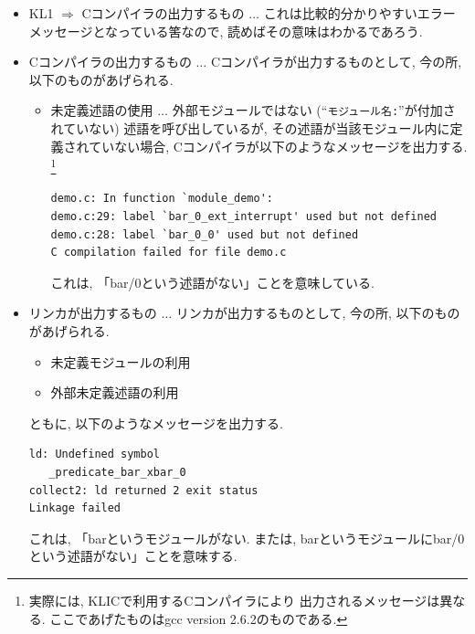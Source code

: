 \documentclass[a4,titlepage]{jsreport}
\begin{document}
\begin{itemize}
\item KL1 $\Rightarrow$ Cコンパイラの出力するもの
$\ldots$ これは比較的分かりやすいエラーメッセージとなっている筈なので, 
読めばその意味はわかるであろう.  

\item Cコンパイラの出力するもの $\ldots$
Cコンパイラが出力するものとして, 今の所, 以下のものがあげられる.  

\begin{itemize}
\item 未定義述語の使用 $\ldots$ 外部モジュールではない 
(``\verb|モジュール名:|''が付加されていない) 述語を呼び出しているが, 
その述語が当該モジュール内に定義されていない場合, 
Cコンパイラが以下のようなメッセージを出力する.  
\footnote{実際には, KLICで利用するCコンパイラにより
出力されるメッセージは異なる.  
ここであげたものはgcc version 2.6.2のものである.  }

\medskip
\begin{Verbatim}[frame=single,baselinestretch=0.8]
demo.c: In function `module_demo':
demo.c:29: label `bar_0_ext_interrupt' used but not defined
demo.c:28: label `bar_0_0' used but not defined
C compilation failed for file demo.c
\end{Verbatim}

これは, 「bar/0という述語がない」ことを意味している.  
\end{itemize}

\item リンカが出力するもの $\ldots$
リンカが出力するものとして, 今の所, 以下のものがあげられる.  

\begin{itemize}
\item 未定義モジュールの利用
\item 外部未定義述語の利用
\end{itemize}
ともに, 以下のようなメッセージを出力する.  

\medskip
\begin{Verbatim}[frame=single,baselinestretch=0.8]
ld: Undefined symbol 
   _predicate_bar_xbar_0 
collect2: ld returned 2 exit status
Linkage failed
\end{Verbatim}

これは, 「barというモジュールがない.  または, barというモジュールにbar/0
という述語がない」ことを意味する.  
\end{itemize}
\end{document}
